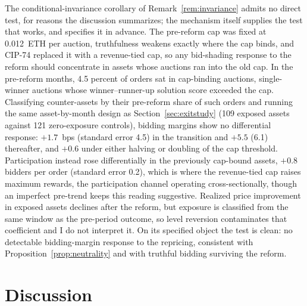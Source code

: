 \documentclass[11pt]{article}
\theoremstyle{plain}
\theoremstyle{definition}
\theoremstyle{remark}
\begin{document}
The conditional-invariance corollary of Remark~\ref{rem:invariance} admits no direct test, for reasons the discussion summarizes; the mechanism itself supplies the test that works, and specifies it in advance. The pre-reform cap was fixed at 0.012~ETH per auction, truthfulness weakens exactly where the cap binds, and CIP-74 replaced it with a revenue-tied cap, so any bid-shading response to the reform should concentrate in assets whose auctions ran into the old cap. In the pre-reform months, 4.5 percent of orders sat in cap-binding auctions, single-winner auctions whose winner--runner-up solution score exceeded the cap. Classifying counter-assets by their pre-reform share of such orders and running the same asset-by-month design as Section~\ref{sec:exitstudy} (109 exposed assets against 121 zero-exposure controls), bidding margins show no differential response: $+1.7$~bps (standard error 4.5) in the transition and $+5.5$ (6.1) thereafter, and $+0.6$ under either halving or doubling of the cap threshold. Participation instead rose differentially in the previously cap-bound assets, $+0.8$ bidders per order (standard error 0.2), which is where the revenue-tied cap raises maximum rewards, the participation channel operating cross-sectionally, though an imperfect pre-trend keeps this reading suggestive. Realized price improvement in exposed assets declines after the reform, but exposure is classified from the same window as the pre-period outcome, so level reversion contaminates that coefficient and I do not interpret it. On its specified object the test is clean: no detectable bidding-margin response to the repricing, consistent with Proposition~\ref{prop:neutrality} and with truthful bidding surviving the reform.

\section{Discussion}\label{sec:discussion}
\end{document}

